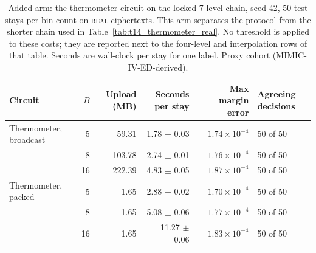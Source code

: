 \begin{table}[t]
\centering
\caption{Added arm: the thermometer circuit on the locked 7-level chain, seed 42, 50 test stays per bin count on \textsc{real} ciphertexts. This arm separates the protocol from the shorter chain used in Table~\ref{tab:t14_thermometer_real}. No threshold is applied to these costs; they are reported next to the four-level and interpolation rows of that table. Seconds are wall-clock per stay for one label. Proxy cohort (MIMIC-IV-ED-derived).}
\label{tab:s8_locked_chain}
\begin{tabular}{lrrrrl}
\toprule
Circuit & $B$ & Upload (MB) & Seconds per stay & Max margin error & Agreeing decisions \\
\midrule
Thermometer, broadcast & 5 & 59.31 & 1.78 $\pm$ 0.03 & $1.74 \times 10^{-4}$ & 50 of 50 \\
 & 8 & 103.78 & 2.74 $\pm$ 0.01 & $1.76 \times 10^{-4}$ & 50 of 50 \\
 & 16 & 222.39 & 4.83 $\pm$ 0.05 & $1.87 \times 10^{-4}$ & 50 of 50 \\
\midrule
Thermometer, packed & 5 & 1.65 & 2.88 $\pm$ 0.02 & $1.70 \times 10^{-4}$ & 50 of 50 \\
 & 8 & 1.65 & 5.08 $\pm$ 0.06 & $1.77 \times 10^{-4}$ & 50 of 50 \\
 & 16 & 1.65 & 11.27 $\pm$ 0.06 & $1.83 \times 10^{-4}$ & 50 of 50 \\
\bottomrule
\end{tabular}
\end{table}
